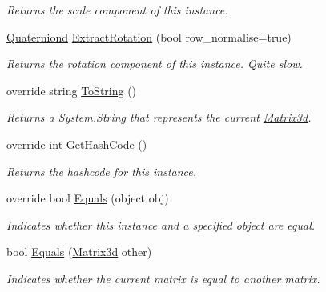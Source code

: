 \begin{DoxyCompactItemize}
\begin{DoxyCompactList}\small\item\em Returns the scale component of this instance. \end{DoxyCompactList}\item 
\hyperlink{struct_open_t_k_1_1_quaterniond}{Quaterniond} \hyperlink{struct_open_t_k_1_1_matrix3d_ad388d821ebd61a9eb4f2875a820e3c1d}{Extract\-Rotation} (bool row\-\_\-normalise=true)
\begin{DoxyCompactList}\small\item\em Returns the rotation component of this instance. Quite slow. \end{DoxyCompactList}\item 
override string \hyperlink{struct_open_t_k_1_1_matrix3d_a4709982a3f013b8a5be534d0b99c7997}{To\-String} ()
\begin{DoxyCompactList}\small\item\em Returns a System.\-String that represents the current \hyperlink{struct_open_t_k_1_1_matrix3d}{Matrix3d}. \end{DoxyCompactList}\item 
override int \hyperlink{struct_open_t_k_1_1_matrix3d_ae870a1857c7e672c506e2e6cc01faf8f}{Get\-Hash\-Code} ()
\begin{DoxyCompactList}\small\item\em Returns the hashcode for this instance. \end{DoxyCompactList}\item 
override bool \hyperlink{struct_open_t_k_1_1_matrix3d_a235c16eefb38132ffaed0e2154254c5d}{Equals} (object obj)
\begin{DoxyCompactList}\small\item\em Indicates whether this instance and a specified object are equal. \end{DoxyCompactList}\item 
bool \hyperlink{struct_open_t_k_1_1_matrix3d_ae8deae73b3d507887f6f81b6dcba352e}{Equals} (\hyperlink{struct_open_t_k_1_1_matrix3d}{Matrix3d} other)
\begin{DoxyCompactList}\small\item\em Indicates whether the current matrix is equal to another matrix.\end{DoxyCompactList}\end{DoxyCompactItemize}
